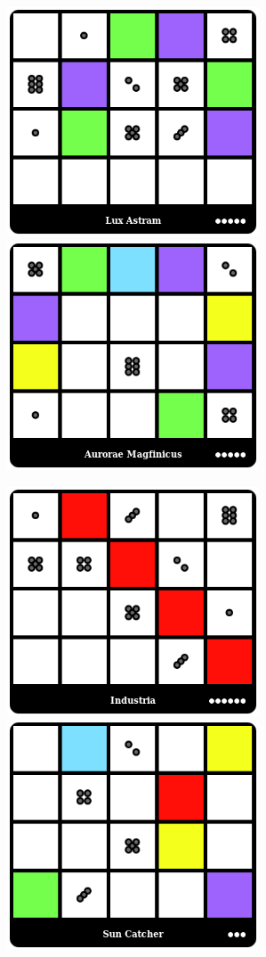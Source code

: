 \centerline{\mbox{\includegraphics[width=75mm]{img/WPC/LuxAstram.png}\includegraphics[width=75mm]{img/WPC/AuroraeMagfinicus.png}}}
\centerline{\mbox{\includegraphics[width=75mm]{img/WPC/Industria.png}\includegraphics[width=75mm]{img/WPC/SunCatcher.png}}}
